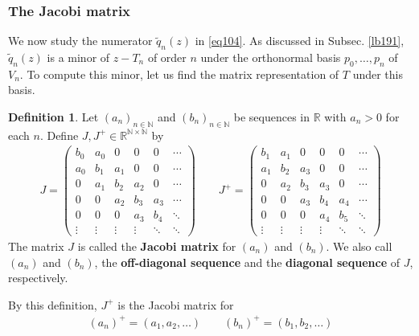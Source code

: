 \documentclass[12pt,b5paper,notitlepage]{article}
\theoremstyle{definition}
\newtheorem{df}{Definition}[subsection]
\theoremstyle{plain}
\newcommand{\wtd}{\widetilde}
\newcommand{\Nbb}{\mathbb N}
\newcommand{\Rbb}{\mathbb R}
\numberwithin{equation}{section}
\begin{document}
\subsubsection{The Jacobi matrix}






We now study the numerator $\wtd q_n(z)$ in \eqref{eq104}. As discussed in Subsec. \ref{lb191}, $\wtd q_n(z)$ is a minor of $z-T_n$ of order $n$ under the orthonormal basis $p_0,\dots,p_n$ of $V_n$. To compute this minor, let us find the matrix representation of $T$ under this basis.


\begin{df}\label{lb193}
Let $(a_n)_{n\in\Nbb}$ and $(b_n)_{n\in\Nbb}$ be sequences in $\Rbb$ with $a_n>0$ for each $n$. Define $J,J^+\in\Rbb^{\Nbb\times\Nbb}$ by
\begin{align*}
J=\begin{pmatrix}
b_0&a_0&0&0&0&\cdots\\
a_0&b_1&a_1&0&0&\cdots\\
0&a_1&b_2&a_2&0&\cdots\\
0&0&a_2&b_3&a_3&\cdots\\
0&0&0&a_3&b_4&\ddots\\
\vdots&\vdots&\vdots&\vdots&\ddots&\ddots
\end{pmatrix}
\qquad
J^+=\begin{pmatrix}
b_1&a_1&0&0&0&\cdots\\
a_1&b_2&a_3&0&0&\cdots\\
0&a_2&b_3&a_3&0&\cdots\\
0&0&a_3&b_4&a_4&\cdots\\
0&0&0&a_4&b_5&\ddots\\
\vdots&\vdots&\vdots&\vdots&\ddots&\ddots
\end{pmatrix}
\end{align*}
The matrix $J$ is called the \textbf{Jacobi matrix}  for $(a_n)$ and $(b_n)$. We also call $(a_n)$ and $(b_n)$, the \textbf{off-diagonal sequence} and the \textbf{diagonal sequence} of $J$, respectively. 
\end{df}

By this definition, $J^+$ is the Jacobi matrix for
\begin{gather}
(a_n)^+=(a_1,a_2,\dots)\qquad (b_n)^+=(b_1,b_2,\dots)
\end{gather}
\end{document}
